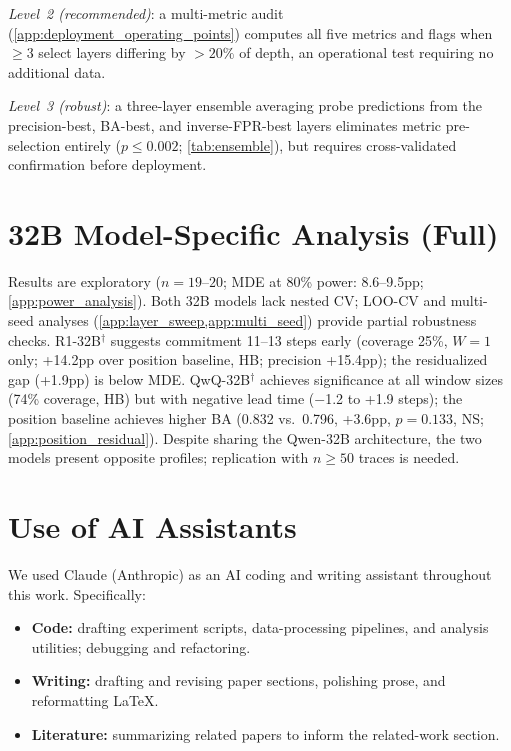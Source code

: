 \emph{Level~2 (recommended)}: a multi-metric audit (\cref{app:deployment_operating_points}) computes all five metrics and flags when ${\geq}3$ select layers differing by ${>}20\%$ of depth, an operational test requiring no additional data.

\emph{Level~3 (robust)}: a three-layer ensemble averaging probe predictions from the precision-best, BA-best, and inverse-FPR-best layers eliminates metric pre-selection entirely ($p \leq 0.002$; \cref{tab:ensemble}), but requires cross-validated confirmation before deployment.

\section{32B Model-Specific Analysis (Full)}
\label{app:32b_full}

Results are exploratory ($n{=}19$--$20$; MDE at 80\% power: 8.6--9.5pp; \cref{app:power_analysis}). Both 32B models lack nested CV; LOO-CV and multi-seed analyses (\cref{app:layer_sweep,app:multi_seed}) provide partial robustness checks. R1-32B$^\dagger$ suggests commitment 11--13 steps early (coverage 25\%, $W{=}1$ only; +14.2pp over position baseline, HB; precision +15.4pp); the residualized gap (+1.9pp) is below MDE. QwQ-32B$^\dagger$ achieves significance at all window sizes (74\% coverage, HB) but with negative lead time ($-$1.2 to +1.9 steps); the position baseline achieves higher BA (0.832 vs.\ 0.796, +3.6pp, $p{=}0.133$, NS; \cref{app:position_residual}). Despite sharing the Qwen-32B architecture, the two models present opposite profiles; replication with $n{\geq}50$ traces is needed.

\section*{Use of AI Assistants}
\label{app:ai-assistants}

We used Claude (Anthropic) as an AI coding and writing assistant throughout this work. Specifically:
\begin{itemize}
    \item \textbf{Code:} drafting experiment scripts, data-processing pipelines, and analysis utilities; debugging and refactoring.
    \item \textbf{Writing:} drafting and revising paper sections, polishing prose, and reformatting LaTeX.
    \item \textbf{Literature:} summarizing related papers to inform the related-work section.
\end{itemize}

